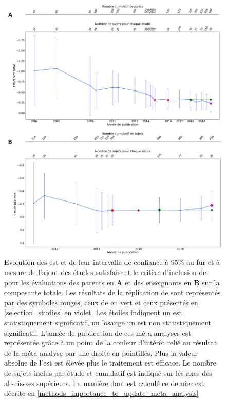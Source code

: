 \begin{figure}[t]
  \centering
	\includegraphics[width=1\linewidth]{figures/chapter-2/meta-analysis-evolution-summary-effect-total} 
  \caption[Evolution des \gls{est} au fur et à mesure de l'ajout de nouvelles études.]{Evolution des \gls{est} et de leur intervalle de confiance à 95\% au fur et à mesure de l'ajout des études satisfaisant le critère d'inclusion de \citet{Cortese2016} pour les évaluations des 
	parents en \textbf{A} et des enseignants en \textbf{B} sur la composante totale.
  Les résultats de la réplication de \citet{Cortese2016} sont représentés par des symboles rouges, ceux de \citet{Bussalb2019clinical} en vert et ceux présentés en \ref{selection_studies} en violet. Les étoiles 
	indiquent un \gls{est} statistiquement significatif, un losange un \gls{est} non statistiquement significatif. L'année de publication de ces méta-analyses est représentée grâce à un point de la couleur 
	d'intérêt relié au résultat de la méta-analyse par une droite en pointillés.
	Plus la valeur absolue de l'\gls{est} est élevée plus le traitement est efficace.
	Le nombre de sujets inclus par étude et cumulatif est indiqué sur les axes des abscissses supérieurs. La manière dont est calculé ce dernier est 
	décrite en \ref{methods_importance_to_update_meta_analysis}}
  \label{Figure:meta_analysis_evolution_est_total}
\end{figure}

